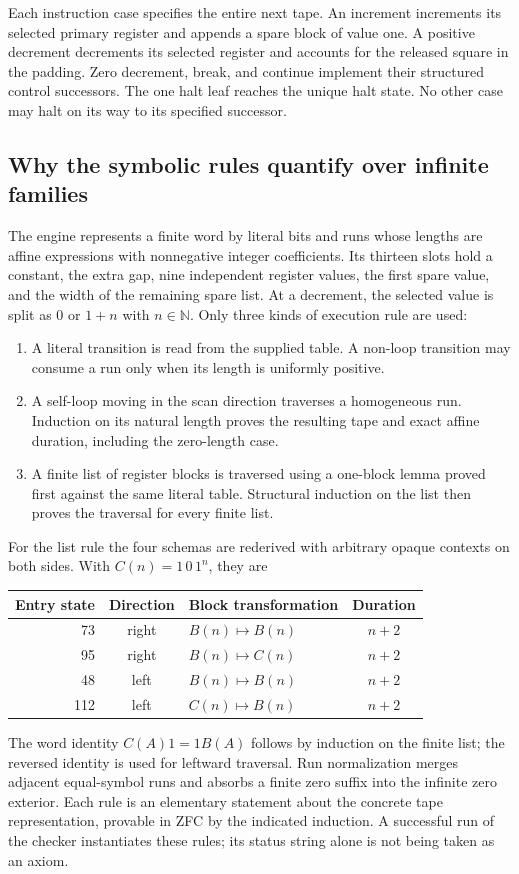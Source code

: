 \documentclass[11pt,a4paper]{article}
\newcommand{\N}{\mathbb N}
\begin{document}
Each instruction case specifies the entire next tape. An increment
increments its selected primary register and appends a spare block of
value one. A positive decrement decrements its selected register and
accounts for the released square in the padding. Zero decrement, break,
and continue implement their structured control successors. The one
halt leaf reaches the unique halt state. No other case may halt on its
way to its specified successor.

\subsection{Why the symbolic rules quantify over infinite families}

The engine represents a finite word by literal bits and runs whose lengths
are affine expressions with nonnegative integer coefficients. Its thirteen
slots hold a constant, the extra gap, nine independent register values,
the first spare value, and the width of the remaining spare list.
At a decrement, the selected value is split as 0 or $1+n$ with $n\in\N$.
Only three kinds of execution rule are used:

\begin{enumerate}
\item A literal transition is read from the supplied table. A non-loop
transition may consume a run only when its length is uniformly positive.
\item A self-loop moving in the scan direction traverses a homogeneous
run. Induction on its natural length proves the resulting tape and exact
affine duration, including the zero-length case.
\item A finite list of register blocks is traversed using a one-block
lemma proved first against the same literal table. Structural induction
on the list then proves the traversal for every finite list.
\end{enumerate}

For the list rule the four schemas are rederived with arbitrary opaque
contexts on both sides. With $C(n)=1\,0\,1^n$, they are
\begin{center}
\begin{tabular}{rclc}
\toprule
Entry state & Direction & Block transformation & Duration\\
\midrule
73 & right & $B(n)\mapsto B(n)$ & $n+2$\\
95 & right & $B(n)\mapsto C(n)$ & $n+2$\\
48 & left & $B(n)\mapsto B(n)$ & $n+2$\\
112 & left & $C(n)\mapsto B(n)$ & $n+2$\\
\bottomrule
\end{tabular}
\end{center}
The word identity $C(A)1=1B(A)$ follows by induction on the finite list;
the reversed identity is used for leftward traversal. Run normalization
merges adjacent equal-symbol runs and absorbs a finite zero suffix into
the infinite zero exterior. Each rule is an elementary statement about
the concrete tape representation, provable in ZFC by the indicated
induction. A successful run of the checker instantiates these rules; its
status string alone is not being taken as an axiom.
\end{document}
